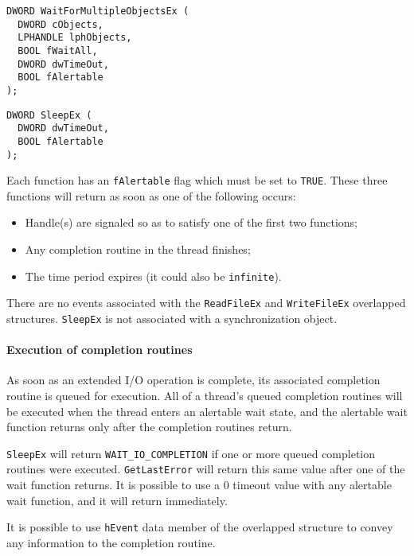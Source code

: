 \begin{verbatim}
DWORD WaitForMultipleObjectsEx (
  DWORD cObjects,
  LPHANDLE lphObjects,
  BOOL fWaitAll,
  DWORD dwTimeOut,
  BOOL fAlertable
);
\end{verbatim}

\begin{verbatim}
DWORD SleepEx (
  DWORD dwTimeOut,
  BOOL fAlertable
);
\end{verbatim}

Each function has an \texttt{fAlertable} flag which must be set to \texttt{TRUE}. These three functions will return as soon as one of the following occurs:
\begin{itemize}
\item Handle(s) are signaled so as to satisfy one of the first two functions;
\item Any completion routine in the thread finishes;
\item The time period expires (it could also be \texttt{infinite}).
\end{itemize}
There are no events associated with the \texttt{ReadFileEx} and \texttt{WriteFileEx} overlapped structures. \texttt{SleepEx} is not associated with a synchronization object.

\paragraph{Execution of completion routines}
As soon as an extended I/O operation is complete, its associated completion routine is queued for execution. All of a thread's queued completion routines will be executed when the thread enters an alertable wait state, and the alertable wait function returns only after the completion routines return.

\texttt{SleepEx} will return \texttt{WAIT\_IO\_COMPLETION} if one or more queued completion routines were executed. \texttt{GetLastError} will return this same value after one of the wait function returns. It is possible to use a 0 timeout value with any alertable wait function, and it will return immediately.

It is possible to use \texttt{hEvent} data member of the overlapped structure to convey any information to the completion routine.